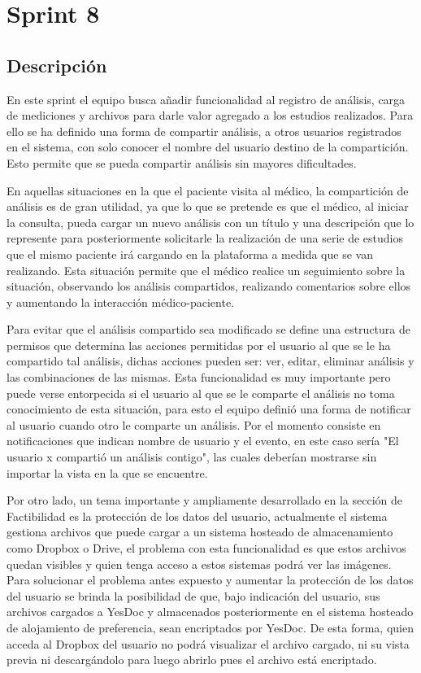 \section{Sprint 8} %



\subsection{Descripción}

En este sprint el equipo busca añadir funcionalidad al registro de análisis, carga de mediciones y archivos para darle valor agregado a los estudios realizados. Para ello se ha definido una forma de compartir análisis, a otros usuarios registrados en el sistema, con solo conocer el nombre del usuario destino de la compartición. Esto permite que se pueda compartir análisis sin mayores dificultades. 
 
En aquellas situaciones en la que el paciente visita al médico, la compartición de análisis es de gran utilidad, ya que lo que se pretende es que el médico, al iniciar la consulta, pueda cargar un nuevo análisis con un título y una descripción que lo represente para posteriormente solicitarle la realización de una serie de estudios que el mismo paciente irá cargando en la plataforma a medida que se van realizando. Esta situación permite que el médico realice un seguimiento sobre la situación, observando los análisis compartidos, realizando comentarios sobre ellos y aumentando la interacción médico-paciente.


 
 Para evitar que el análisis compartido sea modificado se define una estructura de permisos que determina las acciones permitidas por el usuario al que se le ha compartido tal análisis, dichas acciones pueden ser: ver, editar, eliminar análisis y las combinaciones de las mismas. Esta funcionalidad es muy importante pero puede verse entorpecida si el usuario al que se le comparte el análisis no toma conocimiento de esta situación, para esto el equipo definió una forma de notificar al usuario cuando otro le comparte un análisis. Por el momento consiste en notificaciones que indican nombre de usuario y el evento, en este caso sería "El usuario x compartió un análisis contigo", las cuales deberían mostrarse sin importar la vista en la que se encuentre.
 
  Por otro lado, un tema importante y ampliamente desarrollado en la sección de Factibilidad es la protección de los datos del usuario, actualmente el sistema gestiona archivos que puede cargar a un sistema hosteado de almacenamiento como Dropbox o Drive, el problema con esta funcionalidad es que estos archivos quedan visibles y quien tenga acceso a estos sistemas podrá ver las imágenes. Para solucionar el problema antes expuesto y aumentar la protección de los datos del usuario se brinda la posibilidad de que, bajo indicación del usuario, sus archivos cargados a YesDoc y almacenados posteriormente en el sistema hosteado de alojamiento de preferencia, sean encriptados por YesDoc. De esta forma, quien acceda al Dropbox del usuario no podrá visualizar el archivo cargado, ni su vista previa ni descargándolo para luego abrirlo pues el archivo está encriptado. 

